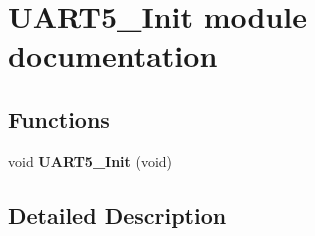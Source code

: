 \hypertarget{group___u_a_r_t5___init__module}{}\section{U\+A\+R\+T5\+\_\+\+Init module documentation}
\label{group___u_a_r_t5___init__module}
\subsection*{Functions}
\begin{DoxyCompactItemize}
\item 
void {\bfseries U\+A\+R\+T5\+\_\+\+Init} (void)\hypertarget{group___u_a_r_t5___init__module_ga4e48ae315c9fd3cc73734273ed4a050f}{}\label{group___u_a_r_t5___init__module_ga4e48ae315c9fd3cc73734273ed4a050f}

\end{DoxyCompactItemize}


\subsection{Detailed Description}

